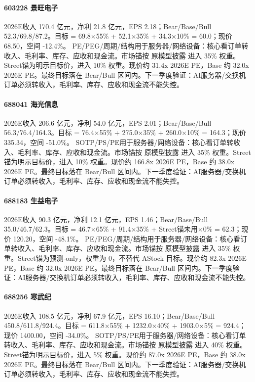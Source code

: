 \paragraph{603228 景旺电子} 2026E收入 170.4 亿元，净利 21.8 亿元，EPS 2.18；Bear/Base/Bull 52.3/69.8/87.2。目标 = 69.8×55\% + 52.1×35\% + 34.3×10\% = 60.0；现价 68.50，空间 -12.4\%。 PE/PEG/周期/结构用于服务器/网络设备：核心看订单转收入、毛利率、库存、应收和现金流。市场锚按 原模型披露 进入 35\% 权重。Street锚为明示目标价，进入 10\% 权重。现价约 31.4x 2026E PE，Base 约 32.0x 2026E PE。最终目标落在 Bear/Bull 区间内。下一季度验证：AI服务器/交换机订单必须转收入，毛利率、库存、应收和现金流不能失控。
\paragraph{688041 海光信息} 2026E收入 206.6 亿元，净利 54.0 亿元，EPS 2.01；Bear/Base/Bull 56.3/76.4/164.3。目标 = 76.4×55\% + 275.0×35\% + 260.0×10\% = 164.3；现价 335.34，空间 -51.0\%。 SOTP/PS/PE用于服务器/网络设备：核心看订单转收入、毛利率、库存、应收和现金流。市场锚按 原模型披露 进入 35\% 权重。Street锚为明示目标价，进入 10\% 权重。现价约 166.8x 2026E PE，Base 约 38.0x 2026E PE。最终目标落在 Bear/Bull 区间内。下一季度验证：AI服务器/交换机订单必须转收入，毛利率、库存、应收和现金流不能失控。
\paragraph{688183 生益电子} 2026E收入 90.3 亿元，净利 12.1 亿元，EPS 1.46；Bear/Base/Bull 35.0/46.7/62.3。目标 = 46.7×65\% + 91.4×35\% + Street锚未用×0\% = 62.3；现价 120.20，空间 -48.1\%。 PE/PEG/周期/结构用于服务器/网络设备：核心看订单转收入、毛利率、库存、应收和现金流。市场锚按 原模型披露 进入 35\% 权重。Street锚为预测-only，权重为 0，不替代 AStock 目标。现价约 82.3x 2026E PE，Base 约 32.0x 2026E PE。最终目标落在 Bear/Bull 区间内。下一季度验证：AI服务器/交换机订单必须转收入，毛利率、库存、应收和现金流不能失控。
\paragraph{688256 寒武纪} 2026E收入 108.5 亿元，净利 67.9 亿元，EPS 16.10；Bear/Base/Bull 450.8/611.8/924.4。目标 = 611.8×55\% + 1232.0×40\% + 1903.0×5\% = 924.4；现价 1400.00，空间 -34.0\%。 SOTP/PS/PE用于服务器/网络设备：核心看订单转收入、毛利率、库存、应收和现金流。市场锚按 原模型披露 进入 40\% 权重。Street锚为明示目标价，进入 5\% 权重。现价约 87.0x 2026E PE，Base 约 38.0x 2026E PE。最终目标落在 Bear/Bull 区间内。下一季度验证：AI服务器/交换机订单必须转收入，毛利率、库存、应收和现金流不能失控。
